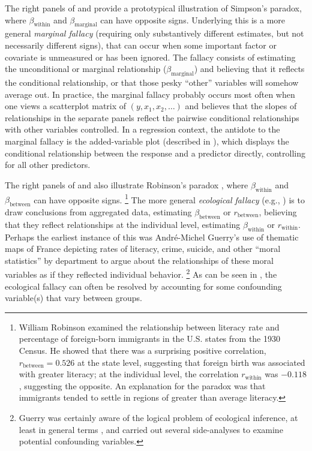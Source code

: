 The right panels of  and  
provide a prototypical illustration of Simpson's paradox,
where $\beta_{\textrm{within}}$ and $\beta_{\textrm{marginal}}$ can have opposite signs. Underlying this is a
more general \emph{marginal fallacy} (requiring only substantively different estimates, but not necessarily
different signs),
that can occur when some important factor or covariate is unmeasured
or has been ignored. The fallacy consists of estimating the unconditional or marginal
relationship ($\beta_{\textrm{marginal}}$) and believing that it reflects the conditional relationship, or that
those pesky ``other'' variables will somehow average out. In practice, the marginal fallacy probably occurs most
often when one views a scatterplot matrix of $(y, x_1, x_2, \dots)$ and believes that the slopes of
relationships in the separate panels reflect the pairwise conditional relationships with other variables
controlled. In a regression context, the antidote to the marginal fallacy is the added-variable
plot (described in ),
which displays the conditional relationship between the response and a predictor directly, controlling for all other predictors.

The right panels of  and  also illustrate Robinson's paradox \citep{Robinson:1950},
where $\beta_{\textrm{within}}$ and $\beta_{\textrm{between}}$ can have opposite signs.%
\footnote{
William Robinson \citeyearpar{Robinson:1950} examined the relationship between literacy rate and percentage
of foreign-born immigrants in the U.S. states from the 1930 Census.
He showed that there was a surprising
positive correlation, $r_{\textrm{between}}= 0.526$ at the state level,
suggesting that foreign birth was associated with greater literacy;
at the individual level, the correlation $r_{\textrm{within}}$ was $-0.118$, suggesting the opposite.
An explanation for the paradox was that immigrants tended to settle in regions of greater than
average literacy.
}
The more general \emph{ecological fallacy} (e.g., \citealp{Lichtman:1974,Kramer:1983})
is to draw conclusions from aggregated data, estimating
$\beta_{\textrm{between}}$ or $r_{\textrm{between}}$, believing that they reflect relationships
at the individual level, estimating $\beta_{\textrm{within}}$ or $r_{\textrm{within}}$.
Perhaps the earliest instance of this was Andr\'e-Michel Guerry's \citeyearpar{Guerry:1833} use of thematic maps of
France depicting rates of literacy, crime, suicide, and other ``moral statistics'' by department to argue
about the relationships of these moral variables as if they reflected individual behavior.%
\footnote{
Guerry was certainly aware of the logical problem of ecological inference, at least in general terms
\citep{Friendly:07:guerry}, and carried out several side-analyses to examine potential confounding
variables.
}
As can be seen in , the ecological fallacy can often be resolved
by accounting for some confounding variable(s) that vary between groups.

